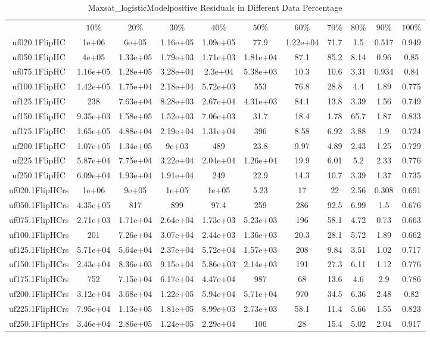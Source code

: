 \begin{table}[htbp]
\caption{Maxsat_logisticModelpositive Residuals in Different Data Percentage}
\centering
\begin{tabular}{|ccccccccccc|}
\hline
 & $10\%$ & $20\%$ & $30\%$ & $40\%$ & $50\%$ & $60\%$ & $70\%$ & $80\%$ & $90\%$ & $100\%$ \\
uf020.1FlipHC & 1e+06 & 6e+05 & 1.16e+05 & 1.09e+05 & 77.9 & 1.22e+04 & 71.7 &  1.5 & 0.517 & 0.949 \\
uf050.1FlipHC & 4e+05 & 1.33e+05 & 1.79e+03 & 1.71e+03 & 1.81e+04 & 87.1 & 85.2 & 8.14 & 0.96 & 0.85 \\
uf075.1FlipHC & 1.16e+05 & 1.28e+05 & 3.28e+04 & 2.3e+04 & 5.38e+03 & 10.3 & 10.6 & 3.31 & 0.934 & 0.84 \\
uf100.1FlipHC & 1.42e+05 & 1.75e+04 & 2.18e+04 & 5.72e+03 &  553 & 76.8 & 28.8 &  4.4 & 1.89 & 0.775 \\
uf125.1FlipHC &  238 & 7.63e+04 & 8.28e+03 & 2.67e+04 & 4.31e+03 & 84.1 & 13.8 & 3.39 & 1.56 & 0.749 \\
uf150.1FlipHC & 9.35e+03 & 1.58e+05 & 1.52e+03 & 7.06e+03 & 31.7 & 18.4 & 1.78 & 65.7 & 1.87 & 0.833 \\
uf175.1FlipHC & 1.65e+05 & 4.88e+04 & 2.19e+04 & 1.31e+04 &  396 & 8.58 & 6.92 & 3.88 &  1.9 & 0.724 \\
uf200.1FlipHC & 1.07e+05 & 1.34e+05 & 9e+03 &  489 & 23.8 & 9.97 & 4.89 & 2.43 & 1.25 & 0.729 \\
uf225.1FlipHC & 5.87e+04 & 7.75e+04 & 3.22e+04 & 2.04e+04 & 1.26e+04 & 19.9 & 6.01 &  5.2 & 2.33 & 0.776 \\
uf250.1FlipHC & 6.09e+04 & 1.93e+04 & 1.91e+04 &  249 & 22.9 & 14.3 & 10.7 & 3.39 & 1.37 & 0.735 \\
uf020.1FlipHCrs & 1e+06 & 9e+05 & 1e+05 & 1e+05 & 5.23 &   17 &   22 & 2.56 & 0.308 & 0.691 \\
uf050.1FlipHCrs & 4.35e+05 &  817 &  899 & 97.4 &  259 &  286 & 92.5 & 6.99 &  1.5 & 0.676 \\
uf075.1FlipHCrs & 2.71e+03 & 1.71e+04 & 2.64e+04 & 1.73e+03 & 5.23e+03 &  196 & 58.1 & 4.72 & 0.73 & 0.663 \\
uf100.1FlipHCrs &  201 & 7.26e+04 & 3.07e+04 & 2.44e+03 & 1.36e+03 & 20.3 & 28.1 & 5.72 & 1.89 & 0.662 \\
uf125.1FlipHCrs & 5.71e+04 & 5.64e+04 & 2.37e+04 & 5.72e+04 & 1.57e+03 &  208 & 9.84 & 3.51 & 1.02 & 0.717 \\
uf150.1FlipHCrs & 2.43e+04 & 8.36e+03 & 9.15e+04 & 5.86e+03 & 2.14e+03 &  191 & 27.3 & 6.11 & 1.12 & 0.776 \\
uf175.1FlipHCrs &  752 & 7.15e+04 & 6.17e+04 & 4.47e+04 &  987 &   68 & 13.6 &  4.6 &  2.9 & 0.786 \\
uf200.1FlipHCrs & 3.12e+04 & 3.68e+04 & 1.22e+05 & 5.94e+04 & 5.71e+04 &  970 & 34.5 & 6.36 & 2.48 & 0.82 \\
uf225.1FlipHCrs & 7.95e+04 & 1.13e+05 & 1.81e+05 & 8.99e+03 & 2.73e+03 & 58.1 & 11.4 & 5.66 & 1.55 & 0.823 \\
uf250.1FlipHCrs & 3.46e+04 & 2.86e+05 & 1.24e+05 & 2.29e+04 &  106 &   28 & 15.4 & 5.02 & 2.04 & 0.917 \\
\hline
\end{tabular}
\end{table}
